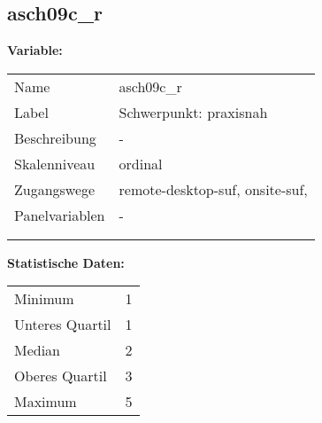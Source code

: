 	
	
	\subsection{asch09c\_r}
	\label{subSection:asch09c_r}

	\noindent\textbf{Variable:}\\
		\begin{tabular}{lL{11.3cm}}
			\label{tableVariable:asch09c_r}
			Name & asch09c\_r \\
			Label & Schwerpunkt: praxisnah \\
			Beschreibung & - \\
			Skalenniveau & ordinal \\
			Zugangswege &
				remote-desktop-suf,
				onsite-suf,
 \\
			Panelvariablen & -
			 \\
			 \\
 \\
		\end{tabular}



		\vspace*{1 cm}
		\noindent\textbf{Statistische Daten:}\\
			\begin{tabular}{ll}
				\label{tableStatistics:asch09c_r}
					Minimum & 1 \\
					Unteres Quartil & 1 \\
					Median & 2 \\
					Oberes Quartil & 3 \\
					Maximum & 5 \\
			\end{tabular}



